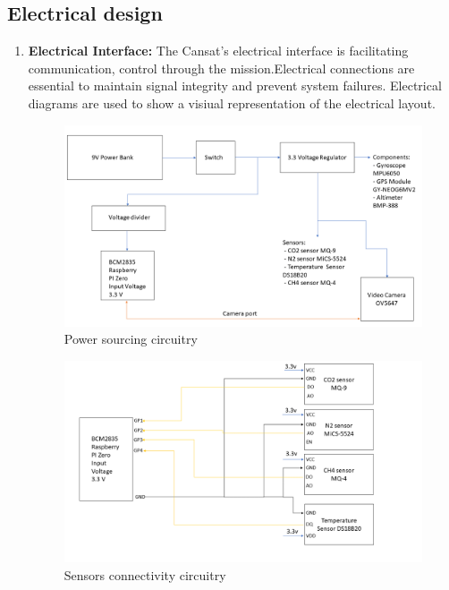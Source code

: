 \documentclass[11pt]{article}
\begin{document}
\subsection{Electrical design}
\begin{enumerate}
\item \textbf{Electrical Interface:} The Cansat’s electrical interface is  facilitating  communication, control through the mission.Electrical connections are essential  to maintain signal  integrity and prevent system failures. Electrical diagrams are used  to show a visiual representation of the electrical layout.

\begin{figure}[H]
\includegraphics[width=15cm]{Schema_electrica1}
\centering
\caption{Power sourcing circuitry}
\end{figure}

\begin{figure}[H]
\includegraphics[width=15cm]{Schema_electrica2}
\centering
\caption{Sensors connectivity circuitry}
\end{figure}


\end{enumerate}
\end{document}
